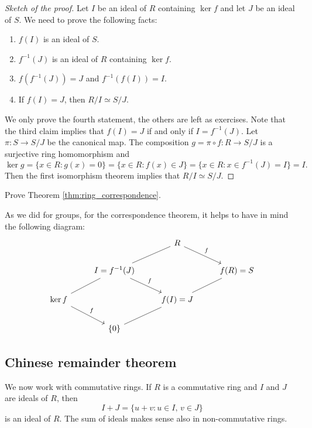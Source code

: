 \begin{proof}[Sketch of the proof]
Let $I$ be an ideal of $R$ containing $\ker f$ and
let $J$ be an ideal of $S$. 
We need to prove the following facts:
\begin{enumerate}
\item $f(I)$ is an ideal of $S$.
\item $f^{-1}(J)$ is an ideal of $R$ containing $\ker f$. 
\item $f(f^{-1}(J))=J$ and $f^{-1}(f(I))=I$. 
\item If $f(I)=J$, then $R/I\simeq S/J$. 
\end{enumerate}
We only prove the fourth statement, the others are left as exercises. Note that
the third claim implies that $f(I)=J$ if and only if $I=f^{-1}(J)$. 
Let 
$\pi\colon S\to S/J$ be the canonical map. The composition
$g=\pi\circ f\colon R\to S/J$ is a surjective ring homomorphism and
\[
\ker g=\{x\in R:g(x)=0\}=\{x\in R:f(x)\in J\}=\{x\in R:x\in f^{-1}(J)=I\}=I.
\]
Then the first isomorphism theorem implies that $R/I\simeq S/J$.
\end{proof}

\begin{exercise}
    Prove Theorem \ref{thm:ring_correspondence}.
\end{exercise}

As we did for groups, for the correspondence theorem, 
it helps to have in mind the following diagram: 
\[
\begin{tikzcd}
        && R \\
        & I=f^{-1}(J) && f(R)=S \\
        \ker f && f(I)=J \\
        & {\{0\}}
        \arrow["f", from=1-3, to=2-4]
        \arrow[no head, from=1-3, to=2-2]
        \arrow[no head, from=2-2, to=3-1]
        \arrow["f", from=3-1, to=4-2]
        \arrow["f", from=2-2, to=3-3]
        \arrow[no head, from=3-3, to=4-2]
        \arrow[no head, from=2-4, to=3-3]
\end{tikzcd}
\]


\subsection{Chinese remainder theorem}

We now work with commutative rings. 
If $R$ is a commutative ring and $I$ and $J$ are ideals of $R$, then
\[
I+J=\{u+v:u\in I,\,v\in J\}
\]
is an ideal of $R$. The sum of ideals makes sense also in non-commutative rings.  

